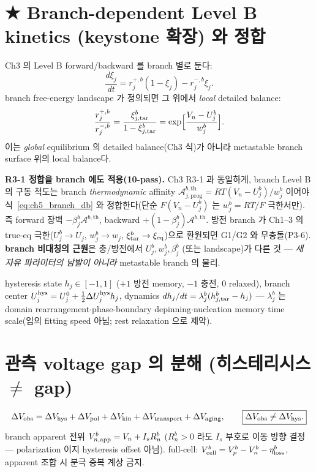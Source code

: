 \section{★ Branch-dependent Level B kinetics (keystone 확장) 와 정합}\label{sec:ch5_levelB}
Ch3 의 Level B forward/backward 를 branch 별로 둔다:
\begin{equation}
\frac{d\xi_j}{dt}=r_j^{+,b}(1-\xi_j)-r_j^{-,b}\xi_j .
\label{eq:ch5_fb}
\end{equation}
branch free-energy landscape 가 정의되면 그 위에서 \emph{local} detailed balance:
\begin{equation}
\frac{r_j^{+,b}}{r_j^{-,b}}=\frac{\xi_{j,\mathrm{tar}}^b}{1-\xi_{j,\mathrm{tar}}^b}=\exp\!\Big[\frac{V_n-U_j^b}{w_j^b}\Big].
\label{eq:ch5_branch_db}
\end{equation}
이는 \emph{global} equilibrium 의 detailed balance(Ch3 식)가 아니라 metastable branch surface 위의
local balance다.
\begin{keybox}
\textbf{R3-1 정합을 branch 에도 적용(10-pass).} Ch3 R3-1 과 동일하게, branch Level B 의 구동 척도는
branch \emph{thermodynamic} affinity $\mathcal A_{j,\mathrm{prog}}^{b,\mathrm{th}}=RT(V_n-U_j^b)/w_j^b$
이어야 식~\eqref{eq:ch5_branch_db} 와 정합한다(단순 $F(V_n-U_j^b)$ 는 $w_j^b=RT/F$ 극한서만). 즉
forward 장벽 $-\beta_j^b\mathcal A^{b,\mathrm{th}}$, backward $+(1-\beta_j^b)\mathcal A^{b,\mathrm{th}}$.
방전 branch 가 Ch1--3 의 true-eq 극한($U_j^b\to U_j$, $w_j^b\to w_j$, $\xi_{\mathrm{tar}}^b\to\xi_{\mathrm{eq}}$)으로
환원되면 G1/G2 와 무충돌(P3-6). \textbf{branch 비대칭의 근원}은 충/방전에서 $U_j^b,w_j^b,\beta_j^b$
(또는 landscape)가 다른 것 — \emph{새 자유 파라미터의 남발이 아니라} metastable branch 의 물리.
\end{keybox}
hysteresis state $h_j\in[-1,1]$ ($+1$ 방전 memory, $-1$ 충전, $0$ relaxed), branch center
$U_j^{\mathrm{hys}}=U_j^0+\tfrac12\Delta U_j^{\mathrm{hys}} h_j$, dynamics $dh_j/dt=\lambda_j^b(h_{j,\mathrm{tar}}^b-h_j)$ — $\lambda_j^b$ 는
domain rearrangement$\cdot$phase-boundary depinning$\cdot$nucleation memory time scale(임의 fitting speed
아님; rest relaxation 으로 제약).

\section{관측 voltage gap 의 분해 (히스테리시스 $\ne$ gap)}\label{sec:ch5_gap}
\begin{equation}
\Delta V_\mathrm{obs}=\Delta V_{\mathrm{hys}}+\Delta V_{\mathrm{pol}}+\Delta V_\mathrm{kin}+\Delta V_\mathrm{transport}+\Delta V_\mathrm{aging},
\qquad \boxed{\Delta V_\mathrm{obs}\ne\Delta V_{\mathrm{hys}}.}
\label{eq:ch5_gap}
\end{equation}
branch apparent 전위 $V_{n,\mathrm{app}}^b=V_n+I_s R_n^b$ ($R_n^b>0$ 라도 $I_s$ 부호로 이동 방향 결정 —
polarization 이지 hysteresis offset 아님). full-cell: $V_{\mathrm{cell}}^b=V_p^b-V_n^b-\eta_\mathrm{loss}^b$, apparent
조합 시 분극 중복 계상 금지.

